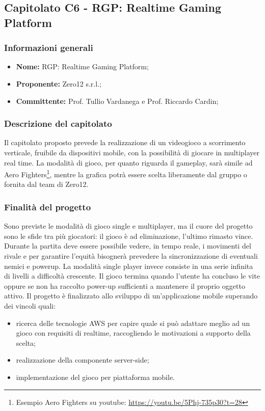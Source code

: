 \subsection{Capitolato C6 - RGP: Realtime Gaming Platform}
\subsubsection{Informazioni generali}
	\begin{itemize}
	\item \textbf{Nome:} RGP: Realtime Gaming Platform;
	\item \textbf{Proponente:} Zero12 s.r.l.;
	\item \textbf{Committente:}  Prof. Tullio Vardanega e Prof. Riccardo Cardin;
	\end{itemize}
\subsubsection{Descrizione del capitolato}
    Il capitolato proposto prevede la realizzazione di un videogioco a scorrimento verticale, fruibile da dispositivi mobile, con la possibilità di giocare in multiplayer real time.
    La modalità di gioco, per quanto riguarda il gameplay, sarà simile ad Aero Fighters\footnote{Esempio Aero Fighters su youtube: \url{https://youtu.be/5Phj-735p30?t=28}}, mentre la grafica potrà essere scelta liberamente dal gruppo o fornita dal team di Zero12.

\subsubsection{Finalità del progetto}
    Sono previste le modalità di gioco single e multiplayer, ma
    il cuore del progetto sono le sfide tra più giocatori: il gioco è ad eliminazione, l'ultimo rimasto vince.
    Durante la partita deve essere possibile vedere, in tempo reale, i movimenti del rivale e per garantire l'equità bisognerà prevedere la sincronizzazione di eventuali nemici e powerup.
    La modalità single player invece consiste in una serie infinita di livelli a difficoltà crescente. Il gioco termina quando l'utente ha concluso le vite oppure se non ha raccolto power-up sufficienti a mantenere il proprio oggetto attivo.
    Il progetto è finalizzato allo sviluppo di un'applicazione mobile superando dei vincoli quali:
    \begin{itemize}
    	\item ricerca delle tecnologie AWS per capire quale si può adattare meglio ad un gioco con requisiti di realtime, raccogliendo le motivazioni a supporto della scelta;
    	\item realizzazione della componente server-side;
    	\item implementazione del gioco per piattaforma mobile.
    \end{itemize}
